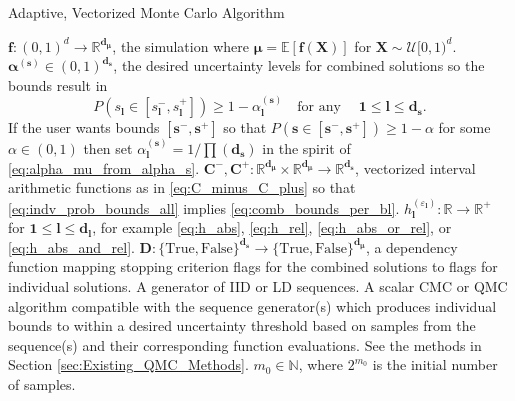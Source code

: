 \documentclass[graybox]{svmult}
\begin{document}
\begin{algorithm}[t]
    \caption{Adaptive, Vectorized Monte Carlo Algorithm}
    \label{algo:MCStoppingCriterion}
    \begin{algorithmic}
    \Require $\boldsymbol{f}: (0,1)^d \to \mathbb{R}^{\boldsymbol{d}_{\boldsymbol{\mu}}}$, the simulation where $\boldsymbol{\mu} = \mathbb{E}[\boldsymbol{f}(\boldsymbol{X})]$ for $\boldsymbol{X} \sim \mathcal{U}[0,1)^d$.
    \Require $\boldsymbol{\alpha}^{(\boldsymbol{s})} \in (0,1)^{\boldsymbol{d}_{\boldsymbol{s}}}$, the desired uncertainty levels for combined solutions so the bounds result in
    \begin{equation}
        P(s_{\boldsymbol{l}} \in [s_{\boldsymbol{l}}^-,s_{\boldsymbol{l}}^+]) \geq 1-\alpha^{(\boldsymbol{s})}_{\boldsymbol{l}} \quad \text{for any}\quad \; \boldsymbol{1} \leq \boldsymbol{l} \leq \boldsymbol{d}_{\boldsymbol{s}}.
        \label{eq:comb_bounds_per_bl}
    \end{equation}
    If the user wants bounds $[\boldsymbol{s}^-,\boldsymbol{s}^+]$ so that $P(\boldsymbol{s} \in [\boldsymbol{s}^-,\boldsymbol{s}^+]) \geq 1-\alpha$ for some $\alpha \in (0,1)$ then set $\alpha_{\boldsymbol{l}}^{(\boldsymbol{s})} = 1/\prod(\boldsymbol{d}_{\boldsymbol{s}})$ in the spirit of \eqref{eq:alpha_mu_from_alpha_s}.
    \Require $\boldsymbol{C}^-,\boldsymbol{C}^+: \mathbb{R}^{\boldsymbol{d}_{\boldsymbol{\mu}}} \times \mathbb{R}^{\boldsymbol{d}_{\boldsymbol{\mu}}} \to \mathbb{R}^{\boldsymbol{d}_{\boldsymbol{s}}}$, vectorized interval arithmetic functions as in \eqref{eq:C_minus_C_plus} so that \eqref{eq:indv_prob_bounds_all} implies \eqref{eq:comb_bounds_per_bl}.
    \Require $h^{(\varepsilon_{\boldsymbol{l}})}_{\boldsymbol{l}}: \mathbb{R} \to \mathbb{R}^+$ for $\boldsymbol{1} \leq \boldsymbol{l} \leq \boldsymbol{d}_{\boldsymbol{l}}$, for example \eqref{eq:h_abs}, \eqref{eq:h_rel}, \eqref{eq:h_abs_or_rel}, or \eqref{eq:h_abs_and_rel}.
    \Require $\boldsymbol{D}: \{\text{True},\text{False}\}^{\boldsymbol{d}_{\boldsymbol{s}}} \to \{\text{True},\text{False}\}^{\boldsymbol{d}_{\boldsymbol{\mu}}}$, a dependency function mapping stopping criterion flags for the combined solutions to flags for individual solutions. 
    \Require A generator of IID or LD sequences.
    \Require A scalar CMC or QMC algorithm compatible with the sequence generator(s) which produces individual bounds to within a desired uncertainty threshold based on samples from the sequence(s) and their corresponding function evaluations. See the methods in Section \ref{sec:Existing_QMC_Methods}.
    \Require $m_0 \in \mathbb{N}$, where $2^{m_0}$ is the initial number of samples.

\end{algorithmic}
\end{algorithm}
\end{document}
